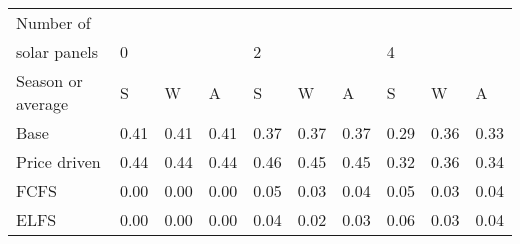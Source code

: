 \begin{table}[h] 
\centering 
\begin{tabular}{l|lll|lll|lll}Number of \\ solar panels&0& & &2& & &4& & \\ \hline 
Season or average & S & W & A & S & W & A & S & W & A \\ \hline 
Base&0.41&0.41&0.41&0.37&0.37&0.37&0.29&0.36&0.33 \\ 
Price driven&0.44&0.44&0.44&0.46&0.45&0.45&0.32&0.36&0.34 \\ 
FCFS&0.00&0.00&0.00&0.05&0.03&0.04&0.05&0.03&0.04 \\ 
ELFS&0.00&0.00&0.00&0.04&0.02&0.03&0.06&0.03&0.04 \\ 
\end{tabular} 
\end{table}